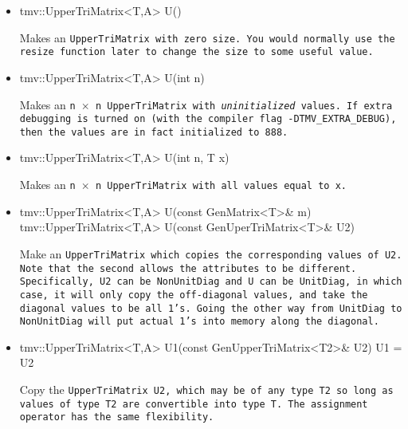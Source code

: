 \begin{itemize}

\item
\begin{tmvcode}
tmv::UpperTriMatrix<T,A> U()
\end{tmvcode}
Makes an \tt{UpperTriMatrix} with zero size.  You would normally use the \tt{resize} function later to
change the size to some useful value.

\item 
\begin{tmvcode}
tmv::UpperTriMatrix<T,A> U(int n)
\end{tmvcode}
Makes an \tt{n} $\times$ \tt{n} \tt{UpperTriMatrix} with {\em uninitialized} values.
If extra debugging is turned on (with the compiler flag \tt{-DTMV\_EXTRA\_DEBUG}), then the values are in fact initialized to 888.  

\item
\begin{tmvcode}
tmv::UpperTriMatrix<T,A> U(int n, T x)
\end{tmvcode}
Makes an \tt{n} $\times$ \tt{n} \tt{UpperTriMatrix} with all values equal to \tt{x}.

\item 
\begin{tmvcode}
tmv::UpperTriMatrix<T,A> U(const GenMatrix<T>& m)
tmv::UpperTriMatrix<T,A> U(const GenUperTriMatrix<T>& U2)
\end{tmvcode}
Make an \tt{UpperTriMatrix} which copies the corresponding values of
\tt{U2}.  Note that the second allows the attributes to be different.
Specifically, \tt{U2} can be \tt{NonUnitDiag} and \tt{U} can be \tt{UnitDiag},
in which case, it will only copy the off-diagonal values, and take
the diagonal values to be all 1's.  Going the other way from \tt{UnitDiag}
to \tt{NonUnitDiag} will put actual 1's into memory along the diagonal.

\item
\begin{tmvcode}
tmv::UpperTriMatrix<T,A> U1(const GenUpperTriMatrix<T2>& U2)
U1 = U2
\end{tmvcode}
Copy the \tt{UpperTriMatrix U2}, which may be of any type \tt{T2} so long
as values of type \tt{T2} are convertible into type \tt{T}.
The assignment operator has the same flexibility.


\end{itemize}
